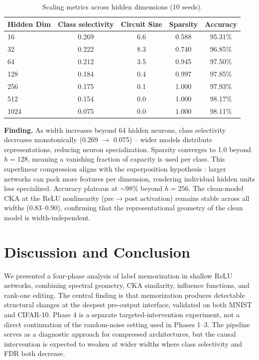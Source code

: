 \documentclass{article}
\begin{document}
\begin{table}[t]
  \centering
  \caption{Scaling metrics across hidden dimensions (10 seeds).}
  \label{tab:scaling}
  \begin{tabular}{lcccc}
    \toprule
    Hidden Dim & Class selectivity & Circuit Size & Sparsity & Accuracy \\
    \midrule
    16 & 0.269 & 6.6 & 0.588 & 95.31\% \\
    32 & 0.222 & 8.3 & 0.740 & 96.85\% \\
    64 & 0.212 & 3.5 & 0.945 & 97.50\% \\
    128 & 0.184 & 0.4 & 0.997 & 97.85\% \\
    256 & 0.175 & 0.1 & 1.000 & 97.93\% \\
    512 & 0.154 & 0.0 & 1.000 & 98.17\% \\
    1024 & 0.075 & 0.0 & 1.000 & 98.11\% \\
    \bottomrule
  \end{tabular}
\end{table}

\textbf{Finding.} As width increases beyond 64 hidden neurons, class selectivity decreases monotonically (0.269 $\to$ 0.075) -- wider models distribute representations, reducing neuron specialization. Sparsity converges to 1.0 beyond $h=128$, meaning a vanishing fraction of capacity is used per class. This superlinear compression aligns with the superposition hypothesis \cite{elhage2022toy}: larger networks can pack more features per dimension, rendering individual hidden units less specialized. Accuracy plateaus at $\sim$98\% beyond $h=256$. The clean-model CKA at the ReLU nonlinearity (pre$\to$post activation) remains stable across all widths (0.83--0.90), confirming that the representational geometry of the clean model is width-independent.

\section{Discussion and Conclusion}
\label{sec:discussion}

We presented a four-phase analysis of label memorization in shallow ReLU networks, combining spectral geometry, CKA similarity, influence functions, and rank-one editing. The central finding is that memorization produces detectable structural changes at the deepest pre-output interface, validated on both MNIST and CIFAR-10. Phase 4 is a separate targeted-intervention experiment, not a direct continuation of the random-noise setting used in Phases 1--3. The pipeline serves as a diagnostic approach for compressed architectures, but the causal intervention is expected to weaken at wider widths where class selectivity and FDR both decrease.
\end{document}
